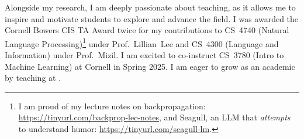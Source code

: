 Alongside my research, I am deeply passionate about teaching, as it allows me to inspire and motivate students to explore and advance the field.
%
I was awarded the Cornell Bowers CIS TA Award twice for my contributions to CS~4740 (Natural Language Processing)\footnote{I am proud of my lecture notes on backpropagation: \url{https://tinyurl.com/backprop-lec-notes}, and Seagull, an LLM that \textit{attempts} to understand humor: \url{https://tinyurl.com/seagull-lm}.} under Prof.~Lillian~Lee and CS~4300 (Language and Information) under Prof.~Mizil. 
%
I am excited to co-instruct CS~3780 (Intro to Machine Learning) at Cornell in Spring 2025.
%
I am eager to grow as an academic by teaching at \thecollegeabbr.
